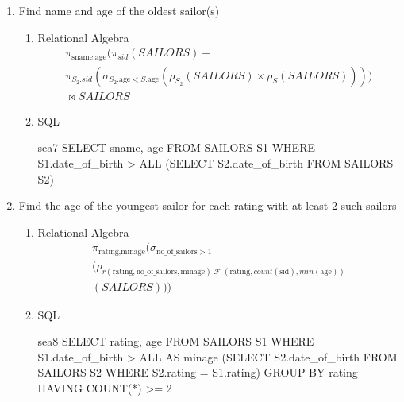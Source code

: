 \begin{enumerate}
      \item Find name and age of the oldest sailor(s)

            \begin{enumerate}
                  \item Relational Algebra
                        \begin{multline*}
                              \pi_{\text{sname}, \text{age}}(\pi_{sid}(SAILORS) - \\
                              \pi_{S_2.sid}(\sigma_{S_2.\text{age} < S.\text{age}}(\rho_{S_2}(SAILORS) \times \rho_{S}(SAILORS)))) \\
                              \bowtie SAILORS
                        \end{multline*}
                  \item SQL

                        \begin{sqlQuery}{sea7}
                        SELECT sname, age FROM SAILORS S1
                        WHERE S1.date_of_birth > ALL
                                (SELECT S2.date_of_birth FROM SAILORS S2)
                        \end{sqlQuery}

            \end{enumerate}

      \item  Find the age of the youngest sailor for each rating with at least 2 such sailors

            \begin{enumerate}
                  \item Relational Algebra
                        \begin{multline*}
                              \pi_{\text{rating}, \text{minage}}(\sigma_{\text{no\_of\_sailors} > 1} \\
                              (\rho_{r (\text{rating}, \text{no\_of\_sailors}, \text{minage}) \; \mathcal{F} \; (\text{rating}, count(\text{sid}), min(\text{age}))} \\
                              (SAILORS)))
                        \end{multline*}
                  \item SQL

                        \begin{sqlQuery}{sea8}
                              SELECT rating, age FROM SAILORS S1
                              WHERE S1.date_of_birth > ALL AS minage
                                          (SELECT S2.date_of_birth FROM SAILORS S2
                                          WHERE S2.rating = S1.rating)
                              GROUP BY rating
                              HAVING COUNT(*) >= 2
                        \end{sqlQuery}
            \end{enumerate}

\end{enumerate}


\pagebreak
